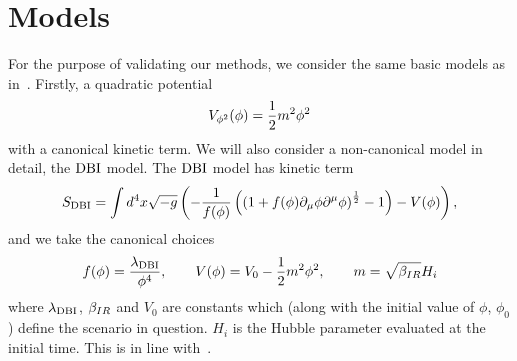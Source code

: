 \section{Models}\label{sec:interactions}
For the purpose of validating our methods,
we consider the same basic models as in~\cite{Funakoshi}.
Firstly, a quadratic potential
\begin{align}\label{eq:quadratic_potential}
    V_{\phi^2}(\phi) = \frac{1}{2}m^2\phi^2
\end{align}
with a canonical kinetic term.
We will also consider a non-canonical model in detail, the $\text{DBI}$ model.
    The $\text{DBI}$ model has kinetic term
\begin{align}\label{eq:dbi_action}
    S_{\text{DBI}}=\int d^4x\sqrt{-g}\left(-\frac{1}{f(\phi)}\left(\left(1+f(\phi)\partial_\mu\phi\partial^\mu\phi\right)^{\frac{1}{2}}-1\right)-V(\phi)\right),
\end{align}
and we take the canonical choices
\begin{align}\label{eq:dbi_warp}
    f(\phi)=\frac{\lambda_{\text{DBI}}}{\phi^4},\qquad
    V(\phi)=V_0-\frac{1}{2}m^2\phi^2,\qquad
    m=\sqrt{\beta_{IR}}H_{i}
\end{align}
where $\lambda_{\text{DBI}}$, $\beta_{IR}$ and $V_0$ are constants which
(along with the initial value of $\phi$, $\phi_0$) define the scenario in question.
$H_i$ is the Hubble parameter evaluated at the initial time.
This is in line with~\cite{Bean_ir_dbi, Chen_dbi}.



